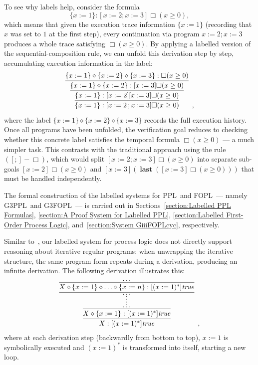 \documentclass[manuscript,screen]{acmart}
\newcommand{\true}[0]{\mathit{true}}
\DeclareMathOperator{\seq}{;}
\newcommand{\cat}[0]{\diamond}
\newcommand{\GiiiPPL}[0]{\mbox{G3PPL}}
\newcommand{\GiiiFOPL}[0]{\mbox{G3FOPL}}
\DeclareMathOperator{\last}{\mathbf{last}}
\newcommand{\PPL}[0]{\mbox{PPL}}
\newcommand{\FOPL}[0]{\mbox{FOPL}}
\begin{document}
To see why labels help, consider the formula $$\{x:=1\} : [x:=2 \seq x := 3]\Box (x\ge 0),$$ which means that given the execution trace information $\{x:=1\}$ (recording that $x$ was set to $1$ at the first step), every continuation via program $x:=2\seq x:=3$ produces a whole trace satisfying $\Box (x\ge 0)$.  By applying a labelled version of the sequential-composition rule, we can unfold this derivation step by step, accumulating execution information in the label:
$$
\infer[]
{\{x:=1\} : [x:=2\seq x:=3]\Box (x\ge 0)}
{
    \infer[]
    {\{x:=1\} : [x:=2][x:=3]\Box (x\ge 0)}
    {
        \infer[]
        {\{x:=1\}\cat \{x:=2\} : [x:=3]\Box (x\ge 0)}
        {
            \{x:=1\}\cat \{x:=2\}\cat \{x:=3\} : \Box (x\ge 0)
        }
    }
}, 
$$
where the label $\{x:=1\}\cat \{x:=2\}\cat \{x:=3\}$ records the full execution history.  Once all programs have been unfolded, the verification goal reduces to checking whether this concrete label satisfies the temporal formula $\Box(x\ge 0)$ --- a much simpler task.  This contrasts with the traditional approach using the rule $([\seq]-\Box)$, which would split $[x:=2\seq x:=3]\Box (x\ge 0)$ into separate sub-goals $[x:=2]\Box (x\ge 0)$ and $[x:=3](\last ([x:=3]\Box (x\ge 0)))$ that must be handled independently.

The formal construction of the labelled systems for \PPL\ and \FOPL\ --- namely \GiiiPPL\ and \GiiiFOPL\ --- is carried out in Sections~\ref{section:Labelled PPL Formulas}, \ref{section:A Proof System for Labelled PPL}, \ref{section:Labelled First-Order Process Logic}, and~\ref{section:System GiiiFOPLcyc}, respectively. 

Similar to~\cite{Docherty19,zhang2025parameterizeddynamiclogic}, our labelled system for process logic does not directly support reasoning about iterative regular programs: when unwrapping the iterative structure, the same program form repeats during a derivation, producing an infinite derivation.
The following derivation illustrates this: 
$$
\begin{aligned}
    \infer[]
    {X : [(x:=1)^*]\true}
    {
        \infer[]
        {X\cat \{x:=1\} : [(x:=1)^*]\true}
        {
            \infer*[]
            {\ldots}
            {
                \infer[]
                {\ldots}
                {
                    \infer[]
                    {X\cat \{x:=1\}\cat\ldots\cat\{x:=n\} : [(x:=1)^*]\true}
                    {\ldots}
                }
            }
        }
    }, 
\end{aligned}
$$
where at each derivation step (backwardly from bottom to top), $x:=1$ is symbolically executed and $(x:=1)^*$ is transformed into itself, starting a new loop.  
\end{document}
